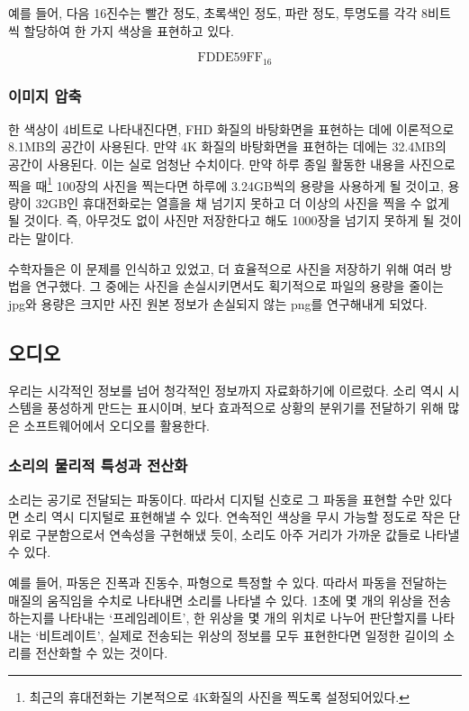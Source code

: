 \documentclass{article}
\begin{document}
예를 들어, 다음 16진수는 빨간 정도, 초록색인 정도, 파란 정도, 투명도를 각각 8비트씩 할당하여
한 가지 색상을 표현하고 있다.

$$
\text{FDDE59FF}_{16}
$$

\subsubsection{이미지 압축}

한 색상이 4비트로 나타내진다면, FHD 화질의 바탕화면을 표현하는 데에 이론적으로 8.1MB의 공간이
사용된다. 만약 4K 화질의 바탕화면을 표현하는 데에는 32.4MB의 공간이 사용된다.
이는 실로 엄청난 수치이다. 만약 하루 종일 활동한 내용을 사진으로 찍을 때\footnote{최근의
휴대전화는 기본적으로 4K화질의 사진을 찍도록 설정되어있다.} 100장의 사진을 찍는다면
하루에 3.24GB씩의 용량을 사용하게 될 것이고, 용량이 32GB인 휴대전화로는 열흘을 채 넘기지 못하고
더 이상의 사진을 찍을 수 없게 될 것이다. 즉, 아무것도 없이 사진만 저장한다고 해도 1000장을
넘기지 못하게 될 것이라는 말이다.

수학자들은 이 문제를 인식하고 있었고, 더 효율적으로 사진을 저장하기 위해 여러 방법을 연구했다.
그 중에는 사진을 손실시키면서도 획기적으로 파일의 용량을 줄이는 jpg와 용량은 크지만 사진 원본
정보가 손실되지 않는 png를 연구해내게 되었다.

\subsection{오디오}

우리는 시각적인 정보를 넘어 청각적인 정보까지 자료화하기에 이르렀다. 소리 역시 시스템을 풍성하게
만드는 표시이며, 보다 효과적으로 상황의 분위기를 전달하기 위해 많은 소프트웨어에서 오디오를 활용한다.

\subsubsection{소리의 물리적 특성과 전산화}

소리는 공기로 전달되는 파동이다. 따라서 디지털 신호로 그 파동을 표현할 수만 있다면 소리 역시
디지털로 표현해낼 수 있다.
연속적인 색상을 무시 가능할 정도로 작은 단위로 구분함으로서 연속성을 구현해냈 듯이, 소리도 아주
거리가 가까운 값들로 나타낼 수 있다.

예를 들어, 파동은 진폭과 진동수, 파형으로 특정할 수 있다. 따라서 파동을 전달하는 매질의 움직임을
수치로 나타내면 소리를 나타낼 수 있다.
1초에 몇 개의 위상을 전송하는지를 나타내는 `프레임레이트', 한 위상을 몇 개의 위치로 나누어 판단할지를
나타내는 `비트레이트', 실제로 전송되는 위상의 정보를 모두 표현한다면 일정한 길이의 소리를 전산화할
수 있는 것이다.
\end{document}
